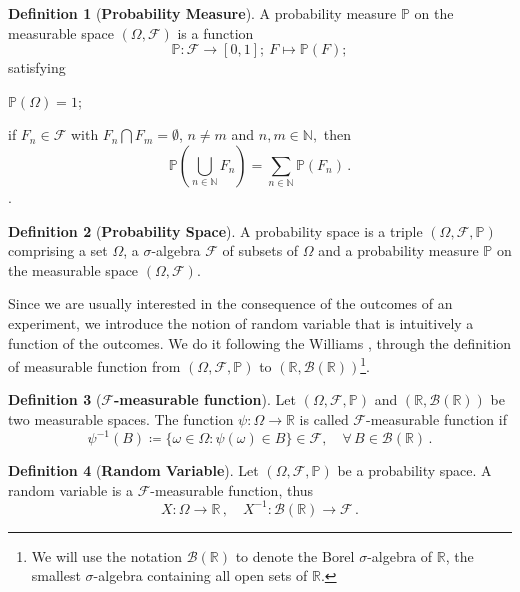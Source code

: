 \documentclass[10pt,a4paper]{book}
\theoremstyle{definition}
\newtheorem{defin}{Definition}[chapter]
\begin{document}
\begin{appendices}
\begin{defin}[\textbf{Probability Measure}]
A probability measure $\mathbb{P}$ on the measurable space $(\Omega,\mathscr{F})$ is a function
\[
\mathbb{P}\colon\mathscr{F} \to [0,1];\: F \mapsto \mathbb{P}(F);
\]
satisfying
\begin{compactenum}[(i)] 
\item $\mathbb{P}(\Omega)=1$; 
\item if $F_n\in\mathscr{F}$ with $F_n\bigcap F_m=\emptyset$, $n\neq m$ and $n,m\in\mathbb{N},$ then 
\[ \mathbb{P}\left(\bigcup_{n\in\mathbb{N}}F_n\right)=\sum_{n\in\mathbb{N}}\mathbb{P}\left(F_n\right)\,.\].
\end{compactenum}
\end{defin}

\begin{defin}[\textbf{Probability Space}]
A probability space is a triple $(\Omega,\mathscr{F},\mathbb{P})$ comprising a set $\Omega$, a $\sigma$-algebra $\mathscr{F}$ of subsets of $\Omega$ and a probability measure $\mathbb{P}$ on the measurable space $(\Omega,\mathscr{F})$.
\end{defin}

\noindent
Since we are usually interested in the consequence of the outcomes of an experiment, we introduce the notion of random variable that is intuitively a function of the outcomes. We do it following the Williams \cite{Williams1991}, through the definition of measurable function from $(\Omega,\mathscr{F},\mathbb{P})$ to $(\mathbb{R},\mathscr{B}(\mathbb{R}))$\footnote{We will use the notation $\mathscr{B}(\mathbb{R})$ to denote the Borel $\sigma$-algebra of $\mathbb{R}$, the smallest $\sigma$-algebra containing all open sets of $\mathbb{R}$.}. 

\begin{defin}[\textbf{$\mathscr{F}$-measurable function}]
Let $(\Omega,\mathscr{F},\mathbb{P})$ and $(\mathbb{R},\mathscr{B}(\mathbb{R}))$ be two measurable spaces. 
The function $\psi\colon \Omega\to\mathbb{R}$ is called $\mathscr{F}$-measurable function if 
\[
\psi^{-1}(B)\coloneqq\{\omega\in\Omega\colon \psi(\omega)\in B \}\in\mathscr{F},\quad\forall\, B\in\mathscr{B}(\mathbb{R})\,.
\]
\end{defin}

\begin{defin}[\textbf{Random Variable}]\label{Def:rv}
Let $(\Omega,\mathscr{F},\mathbb{P})$ be a probability space. A random variable is a $\mathscr{F}$-measurable function, thus
\[
X\colon \Omega \to\mathbb{R}\,,\quad X^{-1}\colon \mathscr{B}(\mathbb{R})\to\mathscr{F}\,.
\]
\end{defin}


\end{appendices}
\end{document}
